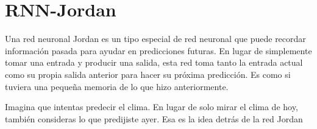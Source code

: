 \documentclass[
]{book}
\begin{document}
\hypertarget{rnn-jordan}{%
\chapter{RNN-Jordan}\label{rnn-jordan}}

Una red neuronal Jordan es un tipo especial de red neuronal que puede recordar información pasada para ayudar en predicciones futuras. En lugar de simplemente tomar una entrada y producir una salida, esta red toma tanto la entrada actual como su propia salida anterior para hacer su próxima predicción. Es como si tuviera una pequeña memoria de lo que hizo anteriormente.

Imagina que intentas predecir el clima. En lugar de solo mirar el clima de hoy, también consideras lo que predijiste ayer. Esa es la idea detrás de la red Jordan
\end{document}
